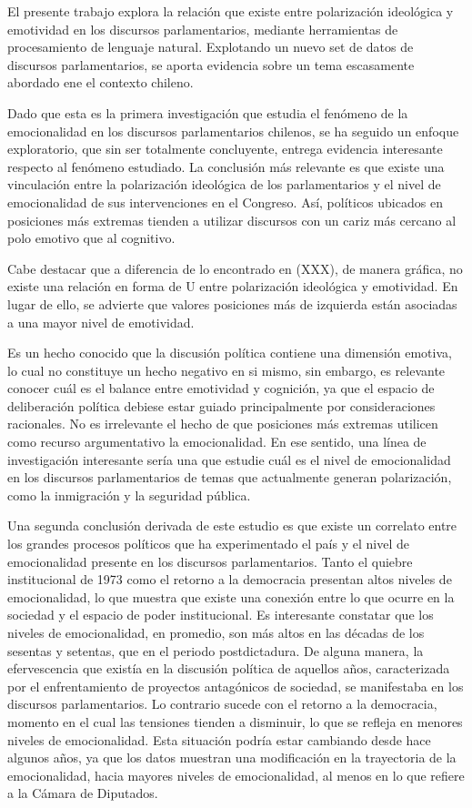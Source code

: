 \documentclass[
  12pt,
]{article}
\begin{document}
El presente trabajo explora la relación que existe entre polarización
ideológica y emotividad en los discursos parlamentarios, mediante
herramientas de procesamiento de lenguaje natural. Explotando un nuevo
set de datos de discursos parlamentarios, se aporta evidencia sobre un
tema escasamente abordado ene el contexto chileno.

Dado que esta es la primera investigación que estudia el fenómeno de la
emocionalidad en los discursos parlamentarios chilenos, se ha seguido un
enfoque exploratorio, que sin ser totalmente concluyente, entrega
evidencia interesante respecto al fenómeno estudiado. La conclusión más
relevante es que existe una vinculación entre la polarización ideológica
de los parlamentarios y el nivel de emocionalidad de sus intervenciones
en el Congreso. Así, políticos ubicados en posiciones más extremas
tienden a utilizar discursos con un cariz más cercano al polo emotivo
que al cognitivo.

Cabe destacar que a diferencia de lo encontrado en (XXX), de manera
gráfica, no existe una relación en forma de U entre polarización
ideológica y emotividad. En lugar de ello, se advierte que valores
posiciones más de izquierda están asociadas a una mayor nivel de
emotividad.

Es un hecho conocido que la discusión política contiene una dimensión
emotiva, lo cual no constituye un hecho negativo en si mismo, sin
embargo, es relevante conocer cuál es el balance entre emotividad y
cognición, ya que el espacio de deliberación política debiese estar
guiado principalmente por consideraciones racionales. No es irrelevante
el hecho de que posiciones más extremas utilicen como recurso
argumentativo la emocionalidad. En ese sentido, una línea de
investigación interesante sería una que estudie cuál es el nivel de
emocionalidad en los discursos parlamentarios de temas que actualmente
generan polarización, como la inmigración y la seguridad pública.

Una segunda conclusión derivada de este estudio es que existe un
correlato entre los grandes procesos políticos que ha experimentado el
país y el nivel de emocionalidad presente en los discursos
parlamentarios. Tanto el quiebre institucional de 1973 como el retorno a
la democracia presentan altos niveles de emocionalidad, lo que muestra
que existe una conexión entre lo que ocurre en la sociedad y el espacio
de poder institucional. Es interesante constatar que los niveles de
emocionalidad, en promedio, son más altos en las décadas de los sesentas
y setentas, que en el periodo postdictadura. De alguna manera, la
efervescencia que existía en la discusión política de aquellos años,
caracterizada por el enfrentamiento de proyectos antagónicos de
sociedad, se manifestaba en los discursos parlamentarios. Lo contrario
sucede con el retorno a la democracia, momento en el cual las tensiones
tienden a disminuir, lo que se refleja en menores niveles de
emocionalidad. Esta situación podría estar cambiando desde hace algunos
años, ya que los datos muestran una modificación en la trayectoria de la
emocionalidad, hacia mayores niveles de emocionalidad, al menos en lo
que refiere a la Cámara de Diputados.
\end{document}
